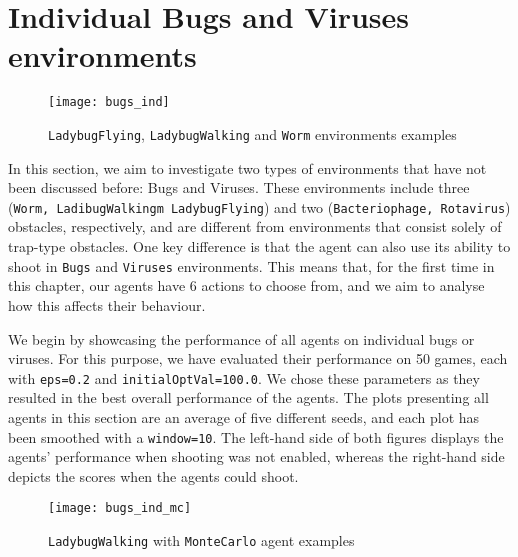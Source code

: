 \section{Individual Bugs and Viruses environments}
\begin{figure}[h]
    \centering
    \texttt{[image: bugs\_ind]}
    \caption{\texttt{LadybugFlying}, \texttt{LadybugWalking} and \texttt{Worm} environments examples}
    \label{fig:bugs_ind_eg}
\end{figure}

In this section, we aim to investigate two types of environments that have not been discussed before: Bugs and Viruses. These environments include three (\texttt{Worm, LadibugWalkingm LadybugFlying}) and two (\texttt{Bacteriophage, Rotavirus}) obstacles, respectively, and are different from environments that consist solely of trap-type obstacles. One key difference is that the agent can also use its ability to shoot in \texttt{Bugs} and \texttt{Viruses} environments. This means that, for the first time in this chapter, our agents have 6 actions to choose from, and we aim to analyse how this affects their behaviour.

We begin by showcasing the performance of all agents on individual bugs or viruses. For this purpose, we have evaluated their performance on 50 games, each with \texttt{eps=0.2} and \texttt{initialOptVal=100.0}. We chose these parameters as they resulted in the best overall performance of the agents. The plots presenting all agents in this section are an average of five different seeds, and each plot has been smoothed with a \texttt{window=10}. The left-hand side of both figures displays the agents' performance when shooting was not enabled, whereas the right-hand side depicts the scores when the agents could shoot.

\begin{figure}[h]
    \centering
    \texttt{[image: bugs\_ind\_mc]}
    \caption{\texttt{LadybugWalking} with \texttt{MonteCarlo} agent examples}
    \label{fig:bugs_ind_mc_eg}
\end{figure}

